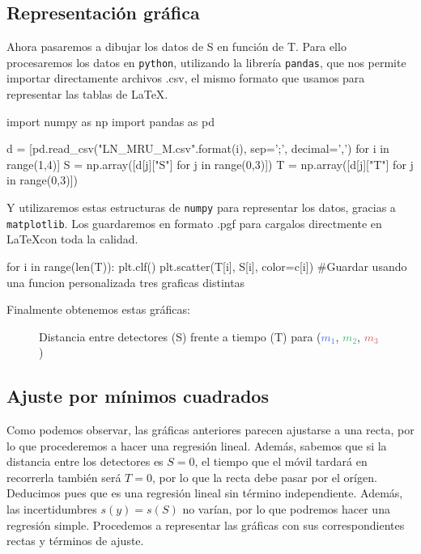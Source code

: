 \documentclass[12pt, a4paper, titlepage]{article}
\newcommand{\code}[1]{\texttt{#1}} %
\begin{document}
  \newpage
  \subsection{Representación gráfica}

  Ahora pasaremos a dibujar los datos de S en función de T. Para ello procesaremos los datos en \code{python}, utilizando la librería \code{pandas}, que nos permite importar directamente archivos .csv, el mismo formato que usamos para representar las tablas de \LaTeX.

  \begin{python}
    import numpy as np
    import pandas as pd

    d = [pd.read_csv("LN_MRU_M{}.csv".format(i), sep=';', decimal=',')
         for i in range(1,4)]
    S = np.array([d[j]["S"] for j in range(0,3)])
    T = np.array([d[j]["T"] for j in range(0,3)])
  \end{python}

  Y utilizaremos estas estructuras de \code{numpy} para representar los datos, gracias a \code{matplotlib}. Los guardaremos en formato .pgf para cargalos directmente en \LaTeX con toda la calidad.

  \begin{python}
    for i in range(len(T)):
        plt.clf()
        plt.scatter(T[i], S[i], color=c[i])
        #Guardar usando una funcion personalizada tres graficas distintas
  \end{python}

  Finalmente obtenemos estas gráficas:
  \begin{figure}[H]
    \centering
     
    
    \caption{Distancia entre detectores (S) frente a tiempo (T) para  (\textcolor{RoyalBlue}{$m_1$}, \textcolor{MediumSeaGreen}{$m_2$}, \textcolor{IndianRed}{$m_3$})}
  \end{figure}

  \newpage
  \subsection{Ajuste por mínimos cuadrados}

  Como podemos observar, las gráficas anteriores parecen ajustarse a una recta, por lo que procederemos a hacer una regresión lineal. Además, sabemos que si la distancia entre los detectores es $S=0$, el tiempo que el móvil tardará en recorrerla también será $T=0$, por lo que la recta debe pasar por el orígen. Deducimos pues que es una regresión lineal sin término independiente. Además, las incertidumbres $s(y) = s(S)$ no varían, por lo que podremos hacer una regresión simple. Procedemos a representar las gráficas con sus correspondientes rectas y términos de ajuste.
\end{document}
